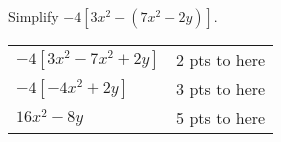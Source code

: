 
{
	Simplify $-4[3x^2-(7x^2-2y)]$.
}
{
	\begin{tabular}{lr}
	$-4[3x^2-7x^2+2y]$ & 2 pts to here \\
	$-4[-4x^2+2y]$ & 3 pts to here\\
	$16x^2-8y$ & 5 pts to here
	\end{tabular}
}

